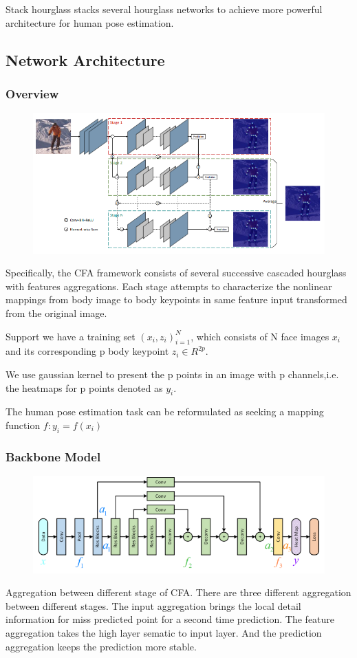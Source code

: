 \documentclass[11pt]{article}
\begin{document}
Stack hourglass stacks several hourglass networks to achieve more powerful architecture for human pose estimation.
\subsection{Network Architecture}
\subsubsection{Overview}
\begin{figure}[h]
	\centering
	\includegraphics[scale = 0.55]{49}
\end{figure}
Specifically, the CFA framework consists of several successive cascaded hourglass with features aggregations. Each stage attempts to characterize the nonlinear mappings from body image to body keypoints in same feature input transformed from the original image.

Support we have a training set ${(x_i,z_i)}^N_{i=1}$, which consists of N face images $x_i$ and its corresponding p body keypoint $z_i \in R^{2p}$.

We use gaussian kernel to present the p points in an image with p channels,i.e. the heatmaps for p points denoted as $y_i$.

The human pose estimation task can be reformulated as seeking a mapping function $f:y_i =f(x_i)$
\subsubsection{Backbone Model}
\begin{figure}[h]
	\centering
	\includegraphics[scale = 0.6]{50}
\end{figure}
Aggregation between different stage of CFA. There are three different aggregation between different stages. The input aggregation brings the local detail information for miss predicted point for a second time prediction. The feature aggregation takes the high layer sematic to input layer. And the 
prediction aggregation keeps the prediction more stable. 
\end{document}
